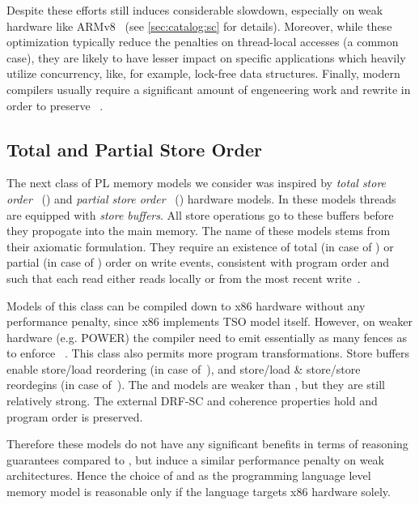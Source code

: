 Despite these efforts \SC still induces considerable slowdown,
especially on weak hardware like ARMv8~\cite{Liu-al:PLDI19} 
(see \cref{sec:catalog:sc} for details).
Moreover, while these optimization typically reduce 
the penalties on thread-local accesses (a common case), 
they are likely to have lesser impact on specific 
applications which heavily utilize concurrency,
like, for example, lock-free data structures.
Finally, modern compilers usually require 
a significant amount of engeneering work and rewrite
in order to preserve \SC~\cite{Marino-al:PLDI11, Liu-al:PLDI19}.


\subsection{Total and Partial Store Order}

The next class of PL memory models we consider 
was inspired by \emph{total store order}~\cite{Sewell-al:CACM10} (\TSO) 
and \emph{partial store order}~\cite{Sparc:94} (\PSO) hardware models. 
In these models threads are equipped with \emph{store buffers}.
All store operations go to these buffers before they 
propogate into the main memory.
The name of these models stems from their axiomatic formulation. 
They require an existence of total (in case of \TSO) 
or partial (in case of \PSO) order on write events, 
consistent with program order and such that 
each read either reads locally or from 
the most recent write~\cite{Sewell-al:CACM10, Lahav-al:POPL16}. 

Models of this class can be compiled down to x86 hardware without any 
performance penalty, since x86 implements TSO model itself.
However, on weaker hardware (e.g. POWER) 
the compiler need to emit essentially as many fences 
as to enforce \SC~\cite{Lustig-al:AISCA15}. 
This class also permits more program transformations.
Store buffers enable store/load reordering (in case of~\TSO),
and store/load \& store/store reordegins (in case of~\PSO).
The \TSO and \PSO models are weaker than \SC, 
but they are still relatively strong.
The external DRF-SC and coherence properties hold
and program order is preserved.

Therefore these models do not have any significant 
benefits in terms of reasoning guarantees compared to \SC,
but induce a similar performance penalty on weak architectures. 
Hence the choice of \TSO and \PSO as the programming language level
memory model is reasonable only if the language targets x86 hardware solely. 

